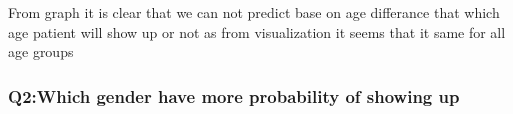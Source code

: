 \documentclass[11pt]{article}
\begin{document}
    \begin{center}
    \end{center}
    { \hspace*{\fill} \\}
    
    \begin{center}
    \end{center}
    { \hspace*{\fill} \\}
    
    From graph it is clear that we can not predict base on age differance
that which age patient will show up or not as from visualization it
seems that it same for all age groups

    \subsubsection{Q2:Which gender have more probability of showing
up}\label{q2which-gender-have-more-probability-of-showing-up}
\end{document}
